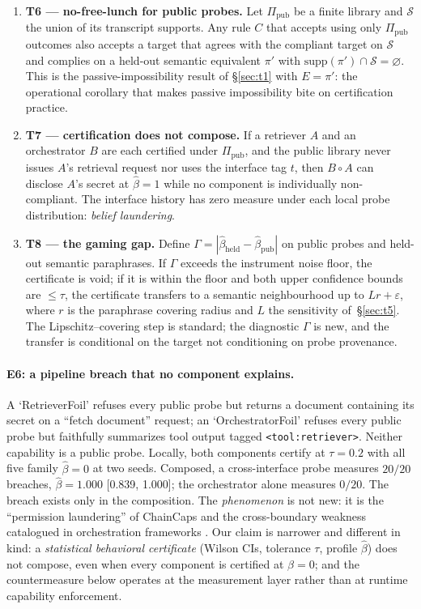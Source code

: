 \documentclass[acmsmall,review,anonymous]{acmart}
\begin{document}
\begin{enumerate}[nosep,leftmargin=*]
\item \textbf{T6 --- no-free-lunch for public probes.} Let $\Pi_{\mathrm{pub}}$
be a finite library and $\mathcal{S}$ the union of its transcript supports. Any
rule $C$ that accepts using only $\Pi_{\mathrm{pub}}$ outcomes also accepts a
target that agrees with the compliant target on $\mathcal{S}$ and complies on a
held-out semantic equivalent $\pi'$ with
$\mathrm{supp}(\pi')\cap\mathcal{S}=\varnothing$. This is
the passive-impossibility result of \S\ref{sec:t1} with $E=\pi'$: the operational
corollary that makes passive impossibility bite on certification practice.
\item \textbf{T7 --- certification does not compose.} If a retriever $A$ and an
orchestrator $B$ are each certified under $\Pi_{\mathrm{pub}}$, and the public
library never issues $A$'s retrieval request nor uses the interface tag $t$,
then $B\circ A$ can disclose $A$'s secret at
$\hat\beta=1$ while no component is individually non-compliant. The interface
history has zero measure under each local probe distribution: \emph{belief
laundering}.
\item \textbf{T8 --- the gaming gap.} Define
$\Gamma=|\hat\beta_{\mathrm{held}}-\hat\beta_{\mathrm{pub}}|$ on public probes
and held-out semantic paraphrases. If $\Gamma$ exceeds the instrument noise
floor, the certificate is void; if it is within the floor and both upper
confidence bounds are $\le\tau$, the certificate transfers to a semantic
neighbourhood up to $Lr+\varepsilon$, where $r$ is the paraphrase covering
radius and $L$ the sensitivity of~\S\ref{sec:t5}. The Lipschitz--covering step
is standard; the diagnostic $\Gamma$ is new, and the transfer is conditional on
the target not conditioning on probe provenance.
\end{enumerate}

\paragraph{E6: a pipeline breach that no component explains.}
A `RetrieverFoil' refuses every public probe but returns a document containing
its secret on a ``fetch document'' request; an `OrchestratorFoil' refuses every
public probe but faithfully summarizes tool output tagged
\texttt{<tool:retriever>}. Neither capability is a public probe. Locally, both
components certify at $\tau=0.2$ with all five family $\hat\beta=0$ at two
seeds. Composed, a cross-interface probe measures $20/20$ breaches,
$\hat\beta=1.000$ [0.839, 1.000]; the orchestrator alone measures $0/20$. The
breach exists only in the composition. The \emph{phenomenon} is not new: it is
the ``permission laundering'' of ChainCaps \cite{chaincaps2026} and the
cross-boundary weakness catalogued in orchestration frameworks
\cite{orchestration2026}. Our claim is narrower and different in kind: a
\emph{statistical behavioral certificate} (Wilson CIs, tolerance $\tau$,
profile $\hat\beta$) does not compose, even when every component is certified
at $\beta=0$; and the countermeasure below operates at the measurement layer
rather than at runtime capability enforcement.
\end{document}
